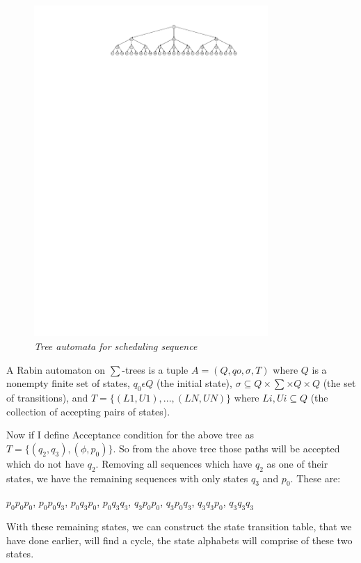 \documentclass[conference]{IEEEtran}
\begin{document}
\begin{figure}[h]
\begin{center}
\includegraphics[width=3.5in]{tree_automata.pdf}
\end{center}
\vspace{-0.1in}
\caption{{\em Tree automata for scheduling sequence }}
\label{fig:automaton}
\end{figure}

A Rabin automaton on $\sum$-trees is a tuple $A = (Q, qo, \sigma, T)$ where $Q$ is a nonempty finite
set of states, $q_0 \epsilon Q$ (the initial state), $\sigma \subseteq Q \times \sum \times Q \times Q$
(the set of transitions), and $T = \{(L1, U1), . . . , (LN, UN)\} $ where $Li, Ui \subseteq Q$
(the collection of accepting pairs of states).

\noindent
Now if I define Acceptance condition for the above tree as $T = \{(q_2, q_3), (\phi, p_0)\}$.
So from the above tree those paths will be accepted which do not have $q_2$. Removing all sequences
which have $q_2$ as one of their states, we have the remaining sequences  with only states $q_3$ and $p_0$.
These are:

 $p_0p_0p_0$, $p_0p_0q_3$, $p_0q_3p_0$,  $p_0q_3q_3$,  $q_3p_0p_0$,  $q_3p_0q_3$,  $q_3q_3p_0$, $q_3q_3q_3$


With these remaining states, we can construct the state transition table, that we have done earlier,
will find a cycle, the state alphabets will comprise of these two states.
\end{document}
